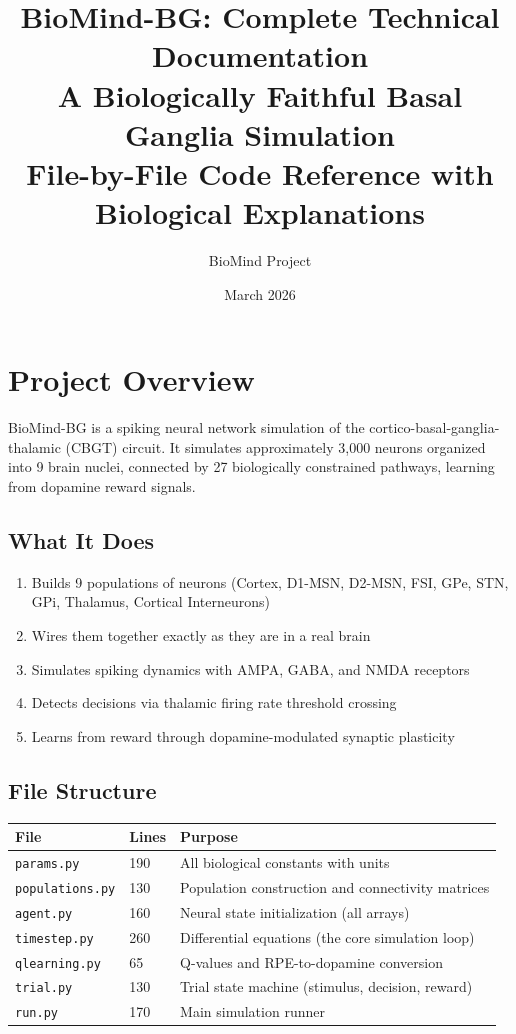 \documentclass[11pt,a4paper]{article}
\title{\textbf{BioMind-BG: Complete Technical Documentation}\\[0.5em]
\large A Biologically Faithful Basal Ganglia Simulation\\
File-by-File Code Reference with Biological Explanations}
\author{BioMind Project}
\date{March 2026}
\begin{document}
\maketitle
\tableofcontents
\newpage

\section{Project Overview}

BioMind-BG is a spiking neural network simulation of the cortico-basal-ganglia-thalamic (CBGT) circuit. It simulates approximately 3,000 neurons organized into 9 brain nuclei, connected by 27 biologically constrained pathways, learning from dopamine reward signals.

\subsection{What It Does}
\begin{enumerate}
    \item Builds 9 populations of neurons (Cortex, D1-MSN, D2-MSN, FSI, GPe, STN, GPi, Thalamus, Cortical Interneurons)
    \item Wires them together exactly as they are in a real brain
    \item Simulates spiking dynamics with AMPA, GABA, and NMDA receptors
    \item Detects decisions via thalamic firing rate threshold crossing
    \item Learns from reward through dopamine-modulated synaptic plasticity
\end{enumerate}

\subsection{File Structure}
\begin{table}[h]
\centering
\begin{tabular}{lll}
\toprule
File & Lines & Purpose \\
\midrule
\texttt{params.py} & 190 & All biological constants with units \\
\texttt{populations.py} & 130 & Population construction and connectivity matrices \\
\texttt{agent.py} & 160 & Neural state initialization (all arrays) \\
\texttt{timestep.py} & 260 & Differential equations (the core simulation loop) \\
\texttt{qlearning.py} & 65 & Q-values and RPE-to-dopamine conversion \\
\texttt{trial.py} & 130 & Trial state machine (stimulus, decision, reward) \\
\texttt{run.py} & 170 & Main simulation runner \\
\bottomrule
\end{tabular}
\end{table}
\end{document}
